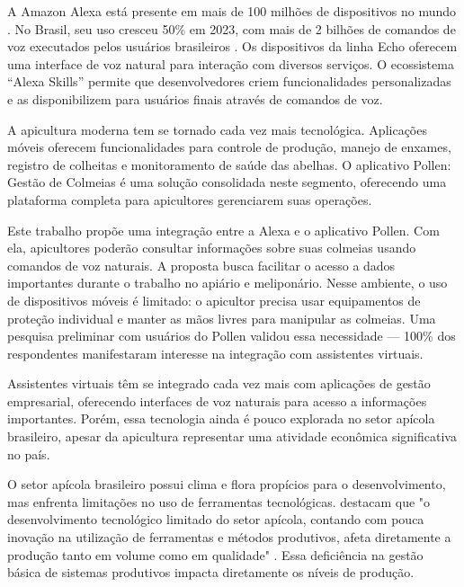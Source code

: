 \label{cap:introducao}

A Amazon Alexa está presente em mais de 100 milhões de dispositivos no mundo \cite{amazon2019alexa100m}. No Brasil, seu uso cresceu 50\% em 2023, com mais de 2 bilhões de comandos de voz executados pelos usuários brasileiros \cite{forbes2024}. Os dispositivos da linha Echo oferecem uma interface de voz natural para interação com diversos serviços. O ecossistema ``Alexa Skills'' permite que desenvolvedores criem funcionalidades personalizadas e as disponibilizem para usuários finais através de comandos de voz.

A apicultura moderna tem se tornado cada vez mais tecnológica. Aplicações móveis oferecem funcionalidades para controle de produção, manejo de enxames, registro de colheitas e monitoramento de saúde das abelhas. O aplicativo Pollen: Gestão de Colmeias é uma solução consolidada neste segmento, oferecendo uma plataforma completa para apicultores gerenciarem suas operações.

Este trabalho propõe uma integração entre a Alexa e o aplicativo Pollen. Com ela, apicultores poderão consultar informações sobre suas colmeias usando comandos de voz naturais. A proposta busca facilitar o acesso a dados importantes durante o trabalho no apiário e meliponário. Nesse ambiente, o uso de dispositivos móveis é limitado: o apicultor precisa usar equipamentos de proteção individual e manter as mãos livres para manipular as colmeias. Uma pesquisa preliminar com usuários do Pollen validou essa necessidade — 100\% dos respondentes manifestaram interesse na integração com assistentes virtuais.


\label{sec:problema-pesquisa-justificativa}

Assistentes virtuais têm se integrado cada vez mais com aplicações de gestão empresarial, oferecendo interfaces de voz naturais para acesso a informações importantes. Porém, essa tecnologia ainda é pouco explorada no setor apícola brasileiro, apesar da apicultura representar uma atividade econômica significativa no país.

O setor apícola brasileiro possui clima e flora propícios para o desenvolvimento, mas enfrenta limitações no uso de ferramentas tecnológicas. \textcite{silva2021} destacam que "o desenvolvimento tecnológico limitado do setor apícola, contando com pouca inovação na utilização de ferramentas e métodos produtivos, afeta diretamente a produção tanto em volume como em qualidade" \cite[p. 10]{silva2021}. Essa deficiência na gestão básica de sistemas produtivos impacta diretamente os níveis de produção.

